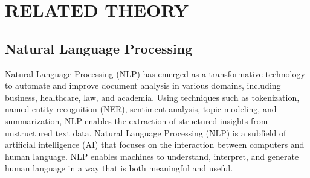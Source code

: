 \chapter{RELATED THEORY}
\section{Natural Language Processing}
Natural Language Processing (NLP) has emerged as a transformative technology to automate and improve document analysis in various domains, including business, healthcare, law, and academia. Using techniques such as tokenization, named entity recognition (NER), sentiment analysis, topic modeling, and summarization, NLP enables the extraction of structured insights from unstructured text data. Natural Language Processing (NLP) is a subfield of artificial intelligence (AI) that focuses on the interaction between computers and human language. NLP enables machines to understand, interpret, and generate human language in a way that is both meaningful and useful.

